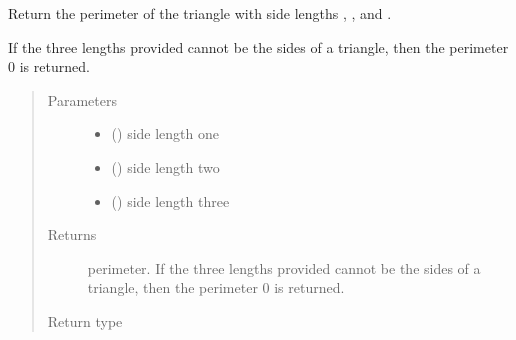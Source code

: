 \documentclass[letterpaper,10pt,english]{sphinxmanual}
\begin{document}

\begin{fulllineitems}
\label{\detokenize{api:trianglelib.utils.compute_perimeter}}
Return the perimeter of the triangle with side lengths , , and .

If the three lengths provided cannot be the sides of a triangle,
then the perimeter 0 is returned.
\begin{quote}\begin{description}
\item[{Parameters}] \leavevmode\begin{itemize}
\item {} 
 () \textendash{} side length one

\item {} 
 () \textendash{} side length two

\item {} 
 () \textendash{} side length three

\end{itemize}

\item[{Returns}] \leavevmode
perimeter. If the three lengths provided cannot be the sides of a triangle, then the perimeter 0 is returned.

\item[{Return type}] \leavevmode
{}

\end{description}\end{quote}

\end{fulllineitems}

\end{document}

